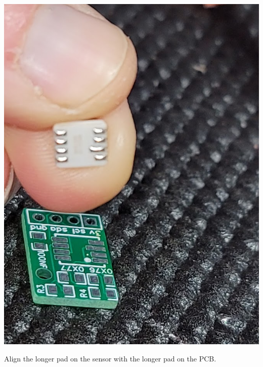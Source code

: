   \begin{marginfigure}
  	\begin{center}
      \includegraphics[width=\MFW]{Images/AppendixB_PCB.jpg}
  		\caption[Alignment for \texttt{MS5803}]{Align the longer pad on the sensor with the longer pad on the PCB.}
  	\end{center}
  \end{marginfigure}

